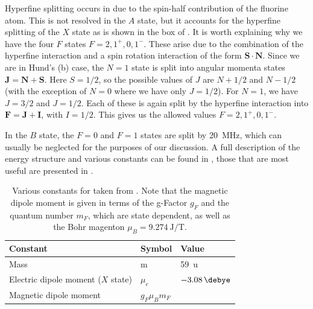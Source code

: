 Hyperfine splitting occurs in \CaF{} due to the spin-half contribution of the
fluorine atom. This is not resolved in the $A$ state, but it accounts for the
hyperfine splitting of the $X$ state as is shown in the box of
. It is worth explaining why we have the four
$F$ states $F=2,1^+,0,1^-$. These arise due to the combination  of the
hyperfine interaction and a spin rotation interaction of the form
$\mathbf{S}\cdot\mathbf{N}$. Since we are in Hund's (b) case, the $N=1$ state
is split into angular momenta states $\mathbf{J}= \mathbf{N} + \mathbf{S}$.
Here $S=1/2$, so the possible values of $J$ are $N+1/2$ and $N-1/2$ (with the
exception of $N=0$ where we have only $J=1/2$). For $N=1$, we have $J=3/2$ and
$J=1/2$. Each of these is again split by the hyperfine interaction into
$\mathbf{F} = \mathbf{J} + \mathbf{I}$, with $I=1/2$. This gives us the allowed
values $F=2,1^+,0,1^-$.

In the $B$ state, the $F=0$ and $F=1$ states are split by \SI{20}{\mega\hertz},
which can usually be neglected for the purposes of our discussion. A full
description of the \CaF{} energy structure and various constants can be found
in , those that are most useful are presented in
.

\begin{table}
  \centering
\begin{tabular}{lll}
  \hline\hline
  Constant & Symbol & Value \\
  \hline
  Mass & m & \SI{59}{\amu}\\
  Electric dipole moment ($X$ state) & $\mu_e$ & $\SI{-3.08}{\debye}$\\
  Magnetic dipole moment & $g_F\mu_B m_F$ & \\
 \hline
\end{tabular}
\caption[\CaF{} constants]{
  Various constants for \CaF{} taken from . Note that
  the magnetic dipole moment is given in terms of the g-Factor $g_F$ and the
  quantum number $m_F$, which are state dependent, as well as the Bohr magenton
  $\mu_B = \SI{9.274}{\joule\per\tesla}$.
  }
  \label{overview:table:constants}
\end{table}

